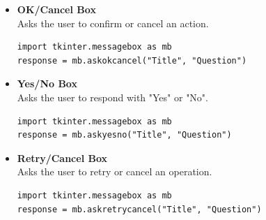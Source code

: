 \begin{itemize}
    \item \textbf{OK/Cancel Box} \\
    Asks the user to confirm or cancel an action.
    \vspace{0.2cm}
    \begin{codebox}
    \begin{verbatim}
import tkinter.messagebox as mb
response = mb.askokcancel("Title", "Question")
    \end{verbatim}
    \end{codebox}
    \vspace{0.3cm}
    
    \item \textbf{Yes/No Box} \\
    Asks the user to respond with "Yes" or "No".
    \vspace{0.2cm}
    \begin{codebox}
    \begin{verbatim}
import tkinter.messagebox as mb
response = mb.askyesno("Title", "Question")
    \end{verbatim}
    \end{codebox}
    \vspace{0.3cm}
    
    \item \textbf{Retry/Cancel Box} \\
    Asks the user to retry or cancel an operation.
    \vspace{0.2cm}
    \begin{codebox}
    \begin{verbatim}
import tkinter.messagebox as mb
response = mb.askretrycancel("Title", "Question")
    \end{verbatim}
    \end{codebox}
    \vspace{0.3cm}
\end{itemize}

\newpage

